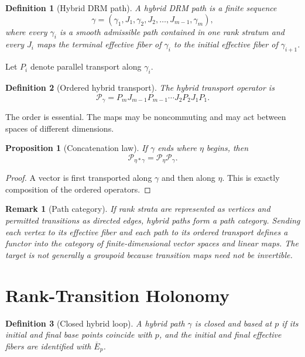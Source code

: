\documentclass[11pt]{article}
\newtheorem{definition}{Definition}[section]
\newtheorem{proposition}{Proposition}[section]
\newtheorem{remark}{Remark}[section]
\begin{document}
\begin{definition}[Hybrid DRM path]
A hybrid DRM path is a finite sequence
\[
\gamma=(\gamma_1,J_1,\gamma_2,J_2,\ldots,J_{m-1},\gamma_m),
\]
where every $\gamma_i$ is a smooth admissible path contained in one rank
stratum and every $J_i$ maps the terminal effective fiber of $\gamma_i$ to the
initial effective fiber of $\gamma_{i+1}$.
\end{definition}

Let $P_i$ denote parallel transport along $\gamma_i$.

\begin{definition}[Ordered hybrid transport]
The hybrid transport operator is
\[
\mathcal P_\gamma
=P_mJ_{m-1}P_{m-1}\cdots J_2P_2J_1P_1.
\]
\end{definition}

The order is essential. The maps may be noncommuting and may act between
spaces of different dimensions.

\begin{proposition}[Concatenation law]
If $\gamma$ ends where $\eta$ begins, then
\[
\mathcal P_{\eta*\gamma}=\mathcal P_\eta\mathcal P_\gamma.
\]
\end{proposition}

\begin{proof}
A vector is first transported along $\gamma$ and then along $\eta$. This is
exactly composition of the ordered operators.
\end{proof}

\begin{remark}[Path category]
If rank strata are represented as vertices and permitted transitions as
directed edges, hybrid paths form a path category. Sending each vertex to its
effective fiber and each path to its ordered transport defines a functor into
the category of finite-dimensional vector spaces and linear maps. The target
is not generally a groupoid because transition maps need not be invertible.
\end{remark}

\section{Rank-Transition Holonomy}
\label{sec:holonomy}

\begin{definition}[Closed hybrid loop]
A hybrid path $\gamma$ is closed and based at $p$ if its initial and final
base points coincide with $p$, and the initial and final effective fibers are
identified with $\overline E_p$.
\end{definition}
\end{document}
